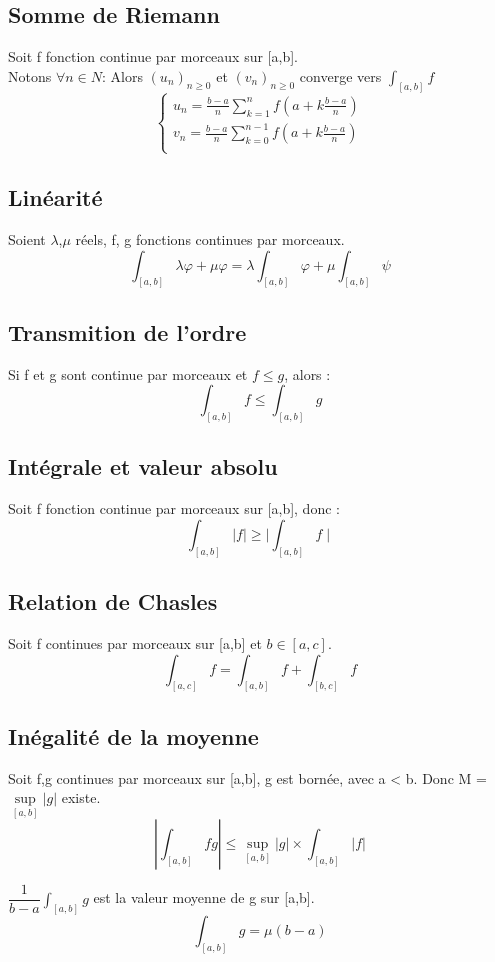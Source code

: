 \subsection{Somme de Riemann}
\begin{prop}
Soit f fonction continue par morceaux sur [a,b].\\
Notons $\forall n \in N$:
Alors $(u_n)_{n \geq 0}$ et $(v_n)_{n \geq 0}$ converge vers $\int_{[a,b]}f$
\[\left\{\begin{array}{l}
   u_n = \frac{b-a}{n} \sum_{k=1}^n f(a+k\frac{b-a}{n} ) \\
   v_n = \frac{b-a}{n} \sum_{k=0}^{n-1} f(a+k\frac{b-a}{n} ) \\
  \end{array}\right.
\]
\end{prop}
\subsection{Linéarité}
\begin{prop}
Soient $\lambda$,$\mu$ réels, f, g fonctions continues par morceaux.
$$\int_{[a,b]}\lambda\varphi + \mu\varphi = \lambda\int_{[a,b]}\varphi + \mu\int_{[a,b]}\psi$$
\end{prop}
\subsection{Transmition de l'ordre}
\begin{prop}
 Si f et g sont continue par morceaux et $f \leq g$, alors :
$$\int_{[a,b]}f \leq \int_{[a,b]}g$$
\end{prop}
\subsection{Intégrale et valeur absolu}
\begin{prop}
Soit f fonction continue par morceaux sur [a,b], donc : 
$$\int_{[a,b]}|f| \geq \mid\int_{[a,b]}f\mid$$
\end{prop}
\subsection{Relation de Chasles}
\begin{prop}
Soit f continues par morceaux sur [a,b] et $b \in [a,c]$.
$$\int_{[a,c]}f = \int_{[a,b]}f + \int_{[b,c]}f$$
\end{prop}
\subsection{Inégalité de la moyenne}
\begin{prop}
Soit f,g continues par morceaux sur [a,b], g est bornée, avec a < b. Donc M = $\underset{[a,b]}\sup|g|$ existe.
$$|\int_{[a,b]}fg| \leq \underset{[a,b]}\sup|g|\times\int_{[a,b]}|f|$$
\end{prop}
\begin{de}
 $\dfrac{1}{b-a}\int_{[a,b]}g$ est la valeur moyenne de g sur [a,b].
$$\int_{[a,b]}g = \mu(b-a)$$
\end{de}
